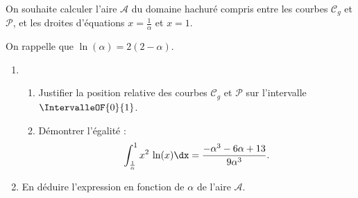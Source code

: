 On souhaite calculer l'aire $\mathcal{A}$ du domaine hachuré compris entre les courbes $\mathcal{C}_{g}$ et $\mathcal{P}$, et les droites d'équations $x=\frac{1}{\alpha}$ et $x=1$.

On rappelle que $\ln (\alpha)=2(2-\alpha)$.

\begin{enumerate}
	\item 
	
	\begin{enumerate}
		\item Justifier la position relative des courbes $\mathcal{C}_{g}$ et $\mathcal{P}$ sur l'intervalle $\IntervalleOF{0}{1}$.
		\item Démontrer l'égalité : \[ \int_{\frac{1}{\alpha}}^{1} x^2\,\ln(x) \dx = \frac{-\alpha^3-6\alpha+13}{9\alpha^3}. \]
	\end{enumerate}
	\item En déduire l'expression en fonction de $\alpha$ de l'aire $\mathcal{A}$.
\end{enumerate}